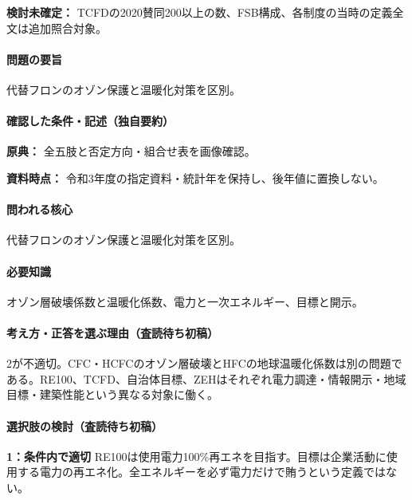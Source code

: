 \par\textbf{検討未確定：} TCFDの2020賛同200以上の数、FSB構成、各制度の当時の定義全文は追加照合対象。

\paragraph{問題の要旨} 代替フロンのオゾン保護と温暖化対策を区別。

\paragraph{確認した条件・記述（独自要約）}\mbox{}\par

\noindent\textbf{原典：} 全五肢と否定方向・組合せ表を画像確認。\par

\noindent\textbf{資料時点：} 令和3年度の指定資料・統計年を保持し、後年値に置換しない。\par

\paragraph{問われる核心} 代替フロンのオゾン保護と温暖化対策を区別。

\paragraph{必要知識} オゾン層破壊係数と温暖化係数、電力と一次エネルギー、目標と開示。

\paragraph{考え方・正答を選ぶ理由（査読待ち初稿）} 2が不適切。CFC・HCFCのオゾン層破壊とHFCの地球温暖化係数は別の問題である。RE100、TCFD、自治体目標、ZEHはそれぞれ電力調達・情報開示・地域目標・建築性能という異なる対象に働く。

\paragraph{選択肢の検討（査読待ち初稿）}\mbox{}\par

\noindent\textbf{1：条件内で適切} RE100は使用電力100\%再エネを目指す。目標は企業活動に使用する電力の再エネ化。全エネルギーを必ず電力だけで賄うという定義ではない。\par

